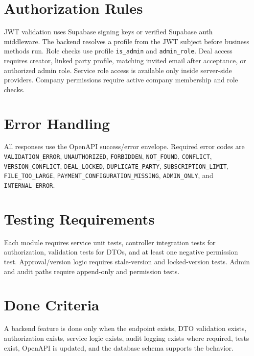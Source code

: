\section*{Authorization Rules}
JWT validation uses Supabase signing keys or verified Supabase auth middleware. The backend resolves a profile from the JWT subject before business methods run. Role checks use profile \texttt{is\_admin} and \texttt{admin\_role}. Deal access requires creator, linked party profile, matching invited email after acceptance, or authorized admin role. Service role access is available only inside server-side providers. Company permissions require active company membership and role checks.

\section*{Error Handling}
All responses use the OpenAPI success/error envelope. Required error codes are \texttt{VALIDATION\_ERROR}, \texttt{UNAUTHORIZED}, \texttt{FORBIDDEN}, \texttt{NOT\_FOUND}, \texttt{CONFLICT}, \texttt{VERSION\_CONFLICT}, \texttt{DEAL\_LOCKED}, \texttt{DUPLICATE\_PARTY}, \texttt{SUBSCRIPTION\_LIMIT}, \texttt{FILE\_TOO\_LARGE}, \texttt{PAYMENT\_CONFIGURATION\_MISSING}, \texttt{ADMIN\_ONLY}, and \texttt{INTERNAL\_ERROR}.

\section*{Testing Requirements}
Each module requires service unit tests, controller integration tests for authorization, validation tests for DTOs, and at least one negative permission test. Approval/version logic requires stale-version and locked-version tests. Admin and audit paths require append-only and permission tests.

\section*{Done Criteria}
A backend feature is done only when the endpoint exists, DTO validation exists, authorization exists, service logic exists, audit logging exists where required, tests exist, OpenAPI is updated, and the database schema supports the behavior.
